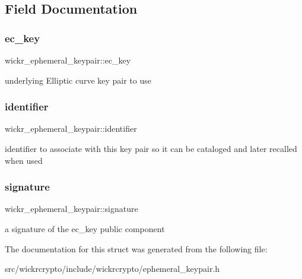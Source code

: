 \subsection{Field Documentation}
\mbox{\label{structwickr__ephemeral__keypair_ad730ed9ba92e05d0a271edc838e548fe}} 
\subsubsection{\texorpdfstring{ec\+\_\+key}{ec\_key}}
{\footnotesize\ttfamily wickr\+\_\+ephemeral\+\_\+keypair\+::ec\+\_\+key}

underlying Elliptic curve key pair to use \mbox{\label{structwickr__ephemeral__keypair_a9220b37a7db764818406bcc84e3ba86b}} 
\subsubsection{\texorpdfstring{identifier}{identifier}}
{\footnotesize\ttfamily wickr\+\_\+ephemeral\+\_\+keypair\+::identifier}

identifier to associate with this key pair so it can be cataloged and later recalled when used \mbox{\label{structwickr__ephemeral__keypair_aea420be2397d798a560fa973be86228c}} 
\subsubsection{\texorpdfstring{signature}{signature}}
{\footnotesize\ttfamily wickr\+\_\+ephemeral\+\_\+keypair\+::signature}

a signature of the \textquotesingle{}ec\+\_\+key\textquotesingle{} public component 

The documentation for this struct was generated from the following file\+:\begin{DoxyCompactItemize}
\item 
src/wickrcrypto/include/wickrcrypto/ephemeral\+\_\+keypair.\+h\end{DoxyCompactItemize}
